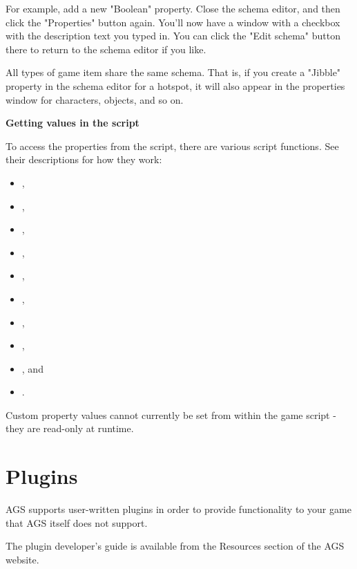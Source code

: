 For example, add a new "Boolean" property. Close the schema editor, and then click the
"Properties" button again. You'll now have a window with a checkbox with the description
text you typed in. You can click the "Edit schema" button there to return to the schema
editor if you like.

All types of game item share the same schema. That is, if you create a "Jibble" property
in the schema editor for a hotspot, it will also appear in the properties window for
characters, objects, and so on.

\bf{Getting values in the script}

To access the properties from the script, there are various script functions. See
their descriptions for how they work:
\begin{itemize}
\item {},
\item {},
\item {},
\item {},
\item {},
\item {},
\item {},
\item {},
\item {}, and
\item {}.
\end{itemize}

Custom property values cannot currently be set from within the game script - they are read-only
at runtime.

\section{Plugins}%

AGS supports user-written plugins in order to provide functionality to your game
that AGS itself does not support.

The plugin developer's guide is available from the Resources section of the AGS website.

